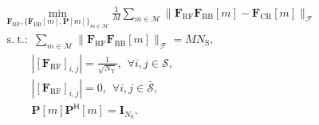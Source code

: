 \documentclass[journal,10pt]{IEEEtran}
\DeclareMathOperator*{\subjectto}{s.\hspace{3pt} t.:\hspace{3pt}} %
\begin{document}
{		%
		\begin{align}
		\label{problem2}
		&\min_{\mathbf{F}_\mathrm{RF},\{\mathbf{F}_\mathrm{BB}[m],\mathbf{P}[m]\}_{m \in \mathcal{M}}} \frac{1}{M}\sum_{m \in \mathcal{M}}\|\mathbf{F}_\mathrm{RF}\mathbf{F}_\mathrm{BB}[m] -\mathbf{F}_\mathrm{CR}[m] \|_\mathcal{F}  \nonumber \\
		&\subjectto \hspace{0pt}\sum_{m \in \mathcal{M}} \| \mathbf{F}_\mathrm{RF}\mathbf{F}_\mathrm{BB}[m] \|_\mathcal{F} = MN_\mathrm{S}, \nonumber \\
		&\hspace{30pt} |[\mathbf{F}_\mathrm{RF}]_{i,j}| = \frac{1}{\sqrt{N_\mathrm{T}}}, \hspace{5pt} \forall i,j\in \mathcal{S},  \nonumber \\
		&\hspace{30pt} |[\mathbf{F}_\mathrm{RF}]_{i,j}| = 0, \hspace{5pt} \forall i,j\in \bar{\mathcal{S}}, \nonumber\\
		& \hspace{30pt}\mathbf{P}[m]\mathbf{P}^\textsf{H}[m] = \mathbf{I}_{N_\mathrm{S}}.
		\end{align}
		
}
\end{document}
